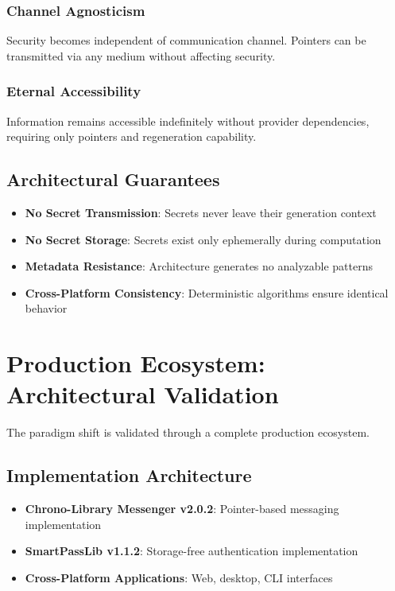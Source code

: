 \documentclass[11pt,a4paper]{article}
\begin{document}
\subsubsection{Channel Agnosticism}
Security becomes independent of communication channel. Pointers can be transmitted via any medium without affecting security.

\subsubsection{Eternal Accessibility}
Information remains accessible indefinitely without provider dependencies, requiring only pointers and regeneration capability.

\subsection{Architectural Guarantees}

\begin{itemize}
    \item \textbf{No Secret Transmission}: Secrets never leave their generation context
    \item \textbf{No Secret Storage}: Secrets exist only ephemerally during computation
    \item \textbf{Metadata Resistance}: Architecture generates no analyzable patterns
    \item \textbf{Cross-Platform Consistency}: Deterministic algorithms ensure identical behavior
\end{itemize}

\section{Production Ecosystem: Architectural Validation}

The paradigm shift is validated through a complete production ecosystem.

\subsection{Implementation Architecture}

\begin{itemize}
    \item \textbf{Chrono-Library Messenger v2.0.2}: Pointer-based messaging implementation
    \item \textbf{SmartPassLib v1.1.2}: Storage-free authentication implementation
    \item \textbf{Cross-Platform Applications}: Web, desktop, CLI interfaces
\end{itemize}
\end{document}
